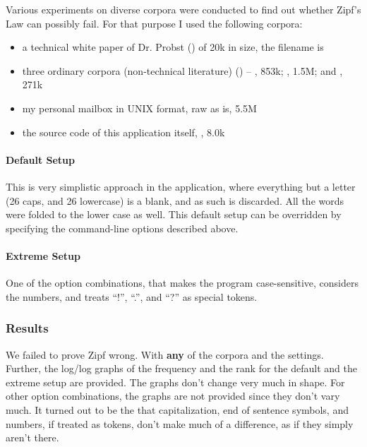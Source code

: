 Various experiments on diverse corpora were conducted to find
out whether Zipf's Law can possibly fail. For that purpose
I used the following corpora:

\begin{itemize}
\item a technical white paper of Dr. Probst (\cite{probst95}) of 20k in size, the filename is 
\item three ordinary corpora (non-technical literature)
	(\cite{greif, ulysses, speak}) -- , 853k;
	, 1.5M; and , 271k
\item my personal mailbox in UNIX format, raw as is, 5.5M
\item the source code of this application itself, , 8.0k
\end{itemize}


\paragraph{Default Setup}

This is very simplistic approach in the application, where
everything but a letter (26 caps, and 26 lowercase) is a
blank, and as such is discarded. All the words were folded to the
lower case as well. This default setup can be overridden by
specifying the command-line options described above.

\paragraph{Extreme Setup}

One of the option combinations, that makes the program
case-sensitive, considers the numbers, and treats ``!'',
``.'', and ``?'' as special tokens.

\subsubsection{Results}

We failed to prove Zipf wrong. With {\bf any} of the corpora and the settings.
Further, the log/log graphs of the frequency and the rank
for the default and the extreme setup are provided. The graphs don't change very much
in shape. For other option combinations, the graphs are not provided
since they don't vary much.
It turned out to be the that capitalization, end of sentence symbols,
and numbers, if treated as tokens, don't make much of a difference,
as if they simply aren't there.

